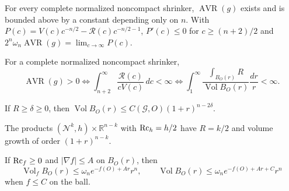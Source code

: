 \begin{theorem}
\label{thm:chow-iv-avr-exists}


For every complete normalized noncompact shrinker, $\operatorname{AVR}(g)$ exists
and is bounded above by a constant depending only on $n$.  With
$P(c)=V(c)c^{-n/2}-\mathcal R(c)c^{-n/2-1}$,
$P'(c)\le0$ for $c\ge(n+2)/2$ and
$2^n\omega_n\operatorname{AVR}(g)=\lim_{c\to\infty}P(c)$.
\end{theorem}

\begin{proposition}
\label{prop:chow-iv-positive-avr}


For a complete normalized noncompact shrinker,
\[
\operatorname{AVR}(g)>0\iff
\int_{n+2}^{\infty}\frac{\mathcal R(c)}{cV(c)}\,dc<\infty
\iff
\int_1^\infty\frac{\int_{B_O(r)}R}{\operatorname{Vol}B_O(r)}\frac{dr}{r}<\infty.
\]
\end{proposition}

\begin{corollary}
\label{cor:chow-iv-volume-lower-scalar}


If $R\ge\delta\ge0$, then
$\operatorname{Vol}B_O(r)\le C(\mathcal G,O)(1+r)^{n-2\delta}$.
\end{corollary}

\begin{remark}
\label{rem:chow-iv-cylinder-shrinkers}

The products $(\mathcal N^k,h)\times\mathbb R^{n-k}$ with $\operatorname{Rc}_h=h/2$ have
$R=k/2$ and volume growth of order $(1+r)^{n-k}$.
\end{remark}

\begin{theorem}
\label{thm:chow-iv-bakry-emery-comparison}

If $\operatorname{Rc}_f\ge0$ and $|\nabla f|\le A$ on $B_O(r)$, then
\[
\operatorname{Vol}_fB_O(r)\le\omega_n e^{-f(O)+Ar}r^n,
\qquad
\operatorname{Vol}B_O(r)\le\omega_ne^{-f(O)+Ar+C}r^n
\]
when $f\le C$ on the ball.
\end{theorem}

